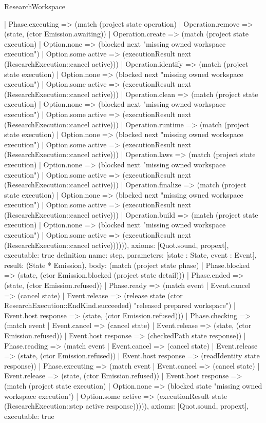 \begin{lexlean}{ResearchWorkspace}
\begin{semanticmodule}
{ | Phase.executing => (match (project state operation)
   | Operation.remove => (state, (ctor Emission.awaiting))
   | Operation.create => (match (project state execution) | Option.none => (blocked next "missing owned workspace execution") | Option.some active => (executionResult next (ResearchExecution::cancel active)))
   | Operation.identify => (match (project state execution) | Option.none => (blocked next "missing owned workspace execution") | Option.some active => (executionResult next (ResearchExecution::cancel active)))
   | Operation.clean => (match (project state execution) | Option.none => (blocked next "missing owned workspace execution") | Option.some active => (executionResult next (ResearchExecution::cancel active)))
   | Operation.runtime => (match (project state execution) | Option.none => (blocked next "missing owned workspace execution") | Option.some active => (executionResult next (ResearchExecution::cancel active)))
   | Operation.laws => (match (project state execution) | Option.none => (blocked next "missing owned workspace execution") | Option.some active => (executionResult next (ResearchExecution::cancel active)))
   | Operation.finalize => (match (project state execution) | Option.none => (blocked next "missing owned workspace execution") | Option.some active => (executionResult next (ResearchExecution::cancel active)))
   | Operation.build => (match (project state execution) | Option.none => (blocked next "missing owned workspace execution") | Option.some active => (executionResult next (ResearchExecution::cancel active)))))),
 axioms: [Quot.sound, propext],
 executable: true
}
definition{
 name: step,
 parameters: [state : State, event : Event],
 result: (State * Emission),
 body: (match (project state phase)
 | Phase.blocked => (state, (ctor Emission.blocked (project state detail)))
 | Phase.ended => (state, (ctor Emission.refused))
 | Phase.ready => (match event | Event.cancel => (cancel state) | Event.release => (release state (ctor ResearchExecution::EndKind.succeeded) "released prepared workspace") | Event.host response => (state, (ctor Emission.refused)))
 | Phase.checking => (match event | Event.cancel => (cancel state) | Event.release => (state, (ctor Emission.refused)) | Event.host response => (checkedPath state response))
 | Phase.reading => (match event | Event.cancel => (cancel state) | Event.release => (state, (ctor Emission.refused)) | Event.host response => (readIdentity state response))
 | Phase.executing => (match event | Event.cancel => (cancel state) | Event.release => (state, (ctor Emission.refused)) | Event.host response => (match (project state execution) | Option.none => (blocked state "missing owned workspace execution") | Option.some active => (executionResult state (ResearchExecution::step active response))))),
 axioms: [Quot.sound, propext],
 executable: true
}


\end{semanticmodule}
\end{lexlean}
